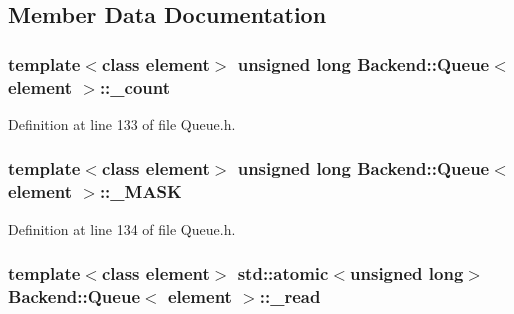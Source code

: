 \subsection{Member Data Documentation}
\hypertarget{class_backend_1_1_queue_ab49d17e24dc0f8a2e5e44c182c240249}{
\subsubsection[{\+\_\+count}]{\setlength{\rightskip}{0pt plus 5cm}template$<$class element$>$ unsigned long {\bf Backend\+::\+Queue}$<$ element $>$\+::\+\_\+count\hspace{0.3cm}{\ttfamily [protected]}}}\label{class_backend_1_1_queue_ab49d17e24dc0f8a2e5e44c182c240249}


Definition at line 133 of file Queue.\+h.

\hypertarget{class_backend_1_1_queue_ab665bcab528d6bad6c4faab1ae0fc1b4}{
\subsubsection[{\+\_\+\+M\+A\+S\+K}]{\setlength{\rightskip}{0pt plus 5cm}template$<$class element$>$ unsigned long {\bf Backend\+::\+Queue}$<$ element $>$\+::\+\_\+\+M\+A\+S\+K\hspace{0.3cm}{\ttfamily [protected]}}}\label{class_backend_1_1_queue_ab665bcab528d6bad6c4faab1ae0fc1b4}


Definition at line 134 of file Queue.\+h.

\hypertarget{class_backend_1_1_queue_a508eb8c4fedb73fc4abbf26353bdfd82}{
\subsubsection[{\+\_\+read}]{\setlength{\rightskip}{0pt plus 5cm}template$<$class element$>$ std\+::atomic$<$unsigned long$>$ {\bf Backend\+::\+Queue}$<$ element $>$\+::\+\_\+read\hspace{0.3cm}{\ttfamily [protected]}}}\label{class_backend_1_1_queue_a508eb8c4fedb73fc4abbf26353bdfd82}


